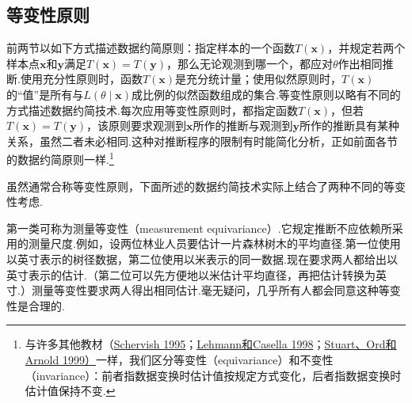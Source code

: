\subsection{等变性原则}\label{sec:6.4}
前两节以如下方式描述数据约简原则：指定样本的一个函数$T(\boldsymbol x)$，并规定若两个样本点$\boldsymbol x$和$\boldsymbol y$满足$T(\boldsymbol x)=T(\boldsymbol y)$，那么无论观测到哪一个，都应对$\theta$作出相同推断.使用充分性原则时，函数$T(\boldsymbol x)$是充分统计量；使用似然原则时，$T(\boldsymbol x)$的“值”是所有与$L(\theta\mid\boldsymbol x)$成比例的似然函数组成的集合.等变性原则以略有不同的方式描述数据约简技术.每次应用等变性原则时，都指定函数$T(\boldsymbol x)$，但若$T(\boldsymbol x)=T(\boldsymbol y)$，该原则要求观测到$\boldsymbol x$所作的推断与观测到$\boldsymbol y$所作的推断具有某种关系，虽然二者未必相同.这种对推断程序的限制有时能简化分析，正如前面各节的数据约简原则一样.\footnote{与许多其他教材（\hyperref[bib:source276]{Schervish 1995}；\hyperref[bib:source200]{Lehmann和Casella 1998}；\hyperref[bib:source311]{Stuart、Ord和Arnold 1999）}一样，我们区分等变性（equivariance）和不变性（invariance）：前者指数据变换时估计值按规定方式变化，后者指数据变换时估计值保持不变.}

虽然通常合称等变性原则，下面所述的数据约简技术实际上结合了两种不同的等变性考虑.

第一类可称为测量等变性（measurement equivariance）.它规定推断不应依赖所采用的测量尺度.例如，设两位林业人员要估计一片森林树木的平均直径.第一位使用以英寸表示的树径数据，第二位使用以米表示的同一数据.现在要求两人都给出以英寸表示的估计.（第二位可以先方便地以米估计平均直径，再把估计转换为英寸.）测量等变性要求两人得出相同估计.毫无疑问，几乎所有人都会同意这种等变性是合理的.

